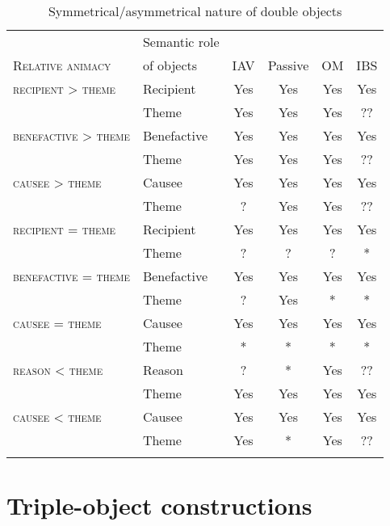 \documentclass[output=paper,
            colorlinks, citecolor=brown
            ,draftmode
		  ]{langscibook}
\begin{document}
\begin{table}
\begin{tabular}{>{\scshape}llcccc}
\lsptoprule
                               & Semantic role & \\
{\normalfont Relative animacy} &  of objects & IAV & Passive & OM & IBS\\\midrule
recipient > theme     & Recipient & Yes & Yes & Yes & Yes\\
                    & Theme & Yes & Yes & Yes & \cellcolor{lsLightGray}??\\
benefactive > theme   & Benefactive & Yes & Yes & Yes & Yes\\
                    & Theme & Yes & Yes & Yes & \cellcolor{lsLightGray}??\\
causee > theme        & Causee & Yes & Yes & Yes & Yes\\
                    & Theme & ? & Yes & Yes & \cellcolor{lsLightGray}??\\
recipient = theme     & Recipient & Yes & Yes & Yes & Yes\\
                    & Theme & ? & ? & ? & \cellcolor{lsLightGray}*\\
benefactive = theme   & Benefactive & Yes & Yes & Yes & Yes\\
                    & Theme & ? & Yes & \cellcolor{lsLightGray}* & \cellcolor{lsLightGray}*\\
causee = theme        & Causee & Yes & Yes & Yes & Yes\\
                    & Theme & \cellcolor{lsLightGray}* & \cellcolor{lsLightGray}* & \cellcolor{lsLightGray}* & \cellcolor{lsLightGray}*\\
reason < theme        & Reason & ? & \cellcolor{lsLightGray}* & Yes & \cellcolor{lsLightGray}??\\
                    & Theme & Yes & Yes & Yes & Yes\\
causee < theme        & Causee & Yes & Yes & Yes & Yes\\
                    & Theme & Yes & \cellcolor{lsLightGray}* & Yes & \cellcolor{lsLightGray}??\\
\lspbottomrule
\end{tabular}
\caption{Symmetrical/asymmetrical nature of double objects}
\label{tab:yoneda:5}
\end{table}

\section{Triple-object constructions}
\label{sec:yoneda:4}
\end{document}
